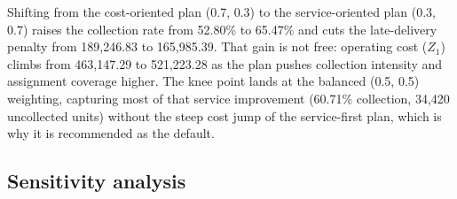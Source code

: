 \documentclass[11pt, a4paper]{article}
\begin{document}
\hypertarget{tab:TOPSIS}{}
\begin{table}[!htb]
    \caption{TOPSIS-selected operating plans under different managerial weightings, Instance 8}
    \label{tab:TOPSIS}
    \centering
    \renewcommand{\arraystretch}{1.25}
\end{table}
\protect\hypertarget{tab:TOPSIS}{}{}
Shifting from the cost-oriented plan (0.7, 0.3) to the service-oriented plan (0.3, 0.7) raises the collection rate from 52.80\% to 65.47\% and cuts the late-delivery penalty from 189{,}246.83 to 165{,}985.39. That gain is not free: operating cost ($Z_1$) climbs from 463{,}147.29 to 521{,}223.28 as the plan pushes collection intensity and assignment coverage higher. The knee point lands at the balanced (0.5, 0.5) weighting, capturing most of that service improvement (60.71\% collection, 34{,}420 uncollected units) without the steep cost jump of the service-first plan, which is why it is recommended as the default.

\hypertarget{sensitivity-analysis}{%
\subsection{Sensitivity analysis}\label{sensitivity-analysis}}
\end{document}
